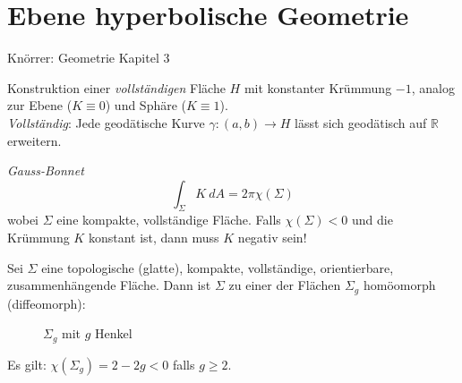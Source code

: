 \documentclass[../main.tex]{subfiles}
\begin{document}
\chapter{Ebene hyperbolische Geometrie}
Knörrer: Geometrie Kapitel 3

\begin{goal}
    Konstruktion einer \emph{vollständigen} Fläche $H$ mit konstanter Krümmung $-1$, analog zur Ebene
    ($K \equiv 0$) und Sphäre ($K \equiv 1$).\\
    \emph{Vollständig}: Jede geodätische Kurve $\gamma : (a,b) \to H$ lässt sich geodätisch auf $\mathbb{R}$ erweitern.
\end{goal}

\begin{motivation}
    \emph{Gauss-Bonnet}
    $$\int _ \Sigma K \ dA = 2 \pi \chi (\Sigma)$$
    wobei $\Sigma$ eine kompakte, vollständige Fläche.
    Falls $\chi (\Sigma) < 0$ und die Krümmung $K$ konstant ist, dann muss $K$ negativ sein!

    \begin{theorem}
        Sei $\Sigma$ eine topologische (glatte), kompakte, vollständige, orientierbare, zusammenhängende Fläche.
        Dann ist $\Sigma$ zu einer der Flächen $\Sigma _g$ homöomorph (diffeomorph): \\
        \begin{figure}[htb]
            \centering
            \def\svgwidth{20em}
            
            \caption{$\Sigma _g$ mit $g$ Henkel}        
        \end{figure}

        Es gilt: $\chi (\Sigma _g)= 2-2g <0$ falls $g \ge 2$.

    \end{theorem}
\end{motivation}

\newpage
\end{document}
